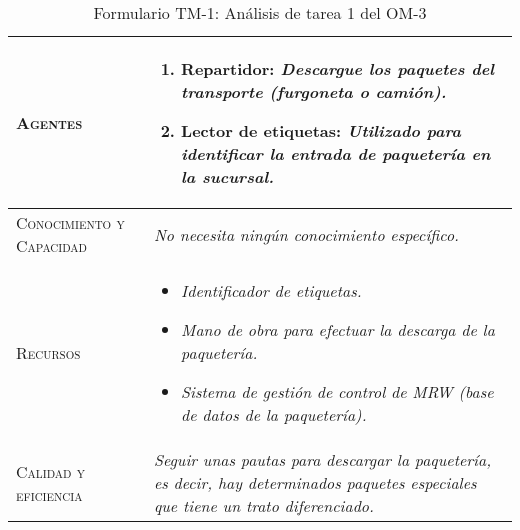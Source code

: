 \begin{table}[H]
{\begin{tabularx}{\textwidth}{|l|X|}
			\hline
			\textsc{Agentes} & 
				\begin{enumerate}
					\item \textbf{Repartidor:} \textit{Descargue los paquetes del transporte (furgoneta o camión).}
					\item \textbf{Lector de etiquetas:} \textit{Utilizado para identificar la entrada de paquetería en la sucursal.}
				\end{enumerate} \\
			\hline
			\textsc{Conocimiento y Capacidad} & \textit{No necesita ningún conocimiento específico.} \\
			\hline
			\textsc{Recursos} & 
				\begin{itemize}
					\item \textit{Identificador de etiquetas.}
					\item \textit{Mano de obra para efectuar la descarga de la paquetería.}
					\item \textit{Sistema de gestión de control de MRW (base de datos de la paquetería).}
				\end{itemize} \\
			\hline
			\textsc{Calidad y eficiencia} & \textit{Seguir unas pautas para descargar la paquetería, es decir, hay determinados paquetes especiales que tiene un trato diferenciado.} \\
			\hline
		\end{tabularx}
	}
	\caption{\label{tab:TM1T1}Formulario TM-1: Análisis de tarea 1 del OM-3}
\end{table} 

